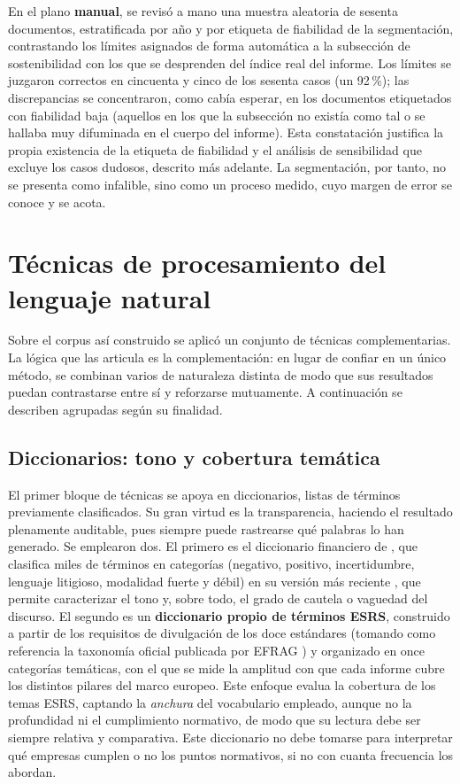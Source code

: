 En el plano \textbf{manual}, se revisó a mano una muestra aleatoria de sesenta documentos,
estratificada por año y por etiqueta de fiabilidad de la segmentación, contrastando los límites
asignados de forma automática a la subsección de sostenibilidad con los que se desprenden del
índice real del informe. Los límites se juzgaron correctos en cincuenta y cinco de los sesenta
casos (un 92\,\%); las discrepancias se concentraron, como cabía esperar, en los documentos
etiquetados con fiabilidad baja (aquellos en los que la subsección no existía como tal o se
hallaba muy difuminada en el cuerpo del informe). Esta constatación justifica la propia
existencia de la etiqueta de fiabilidad y el análisis de sensibilidad que excluye los casos
dudosos, descrito más adelante. La segmentación, por tanto, no se presenta como infalible, sino
como un proceso medido, cuyo margen de error se conoce y se acota.

\section{Técnicas de procesamiento del lenguaje natural}
\label{sec:tecnicas}

Sobre el corpus así construido se aplicó un conjunto de técnicas complementarias. La lógica que
las articula es la complementación: en lugar de confiar en un único método, se combinan varios de
naturaleza distinta de modo que sus resultados puedan contrastarse entre sí y reforzarse mutuamente. A continuación se describen
agrupadas según su finalidad.

\subsection{Diccionarios: tono y cobertura temática}

El primer bloque de técnicas se apoya en diccionarios, listas de términos
previamente clasificados. Su gran virtud es la transparencia, haciendo el resultado plenamente
auditable, pues siempre puede rastrearse qué palabras lo han generado. Se emplearon dos. El
primero es el diccionario financiero de \textcite{loughran2011}, que clasifica miles de
términos en categorías (negativo, positivo, incertidumbre, lenguaje litigioso, modalidad fuerte
y débil) en su versión más reciente \parencite{lmdict2024}, que permite caracterizar el tono y,
sobre todo, el grado de cautela o vaguedad del discurso. El segundo es un
\textbf{diccionario propio de términos ESRS}, construido a partir de los requisitos de
divulgación de los doce estándares (tomando como referencia la taxonomía oficial publicada por
EFRAG \parencite{efrag2023}) y organizado en once categorías temáticas, con el que se mide la
amplitud con que cada informe cubre los distintos pilares del marco europeo. Este enfoque evalua la cobertura de
los temas ESRS, captando la \textit{anchura} del vocabulario empleado, aunque no la profundidad ni el
cumplimiento normativo, de modo que su lectura debe ser siempre relativa y comparativa. Este diccionario no debe 
tomarse para interpretar qué empresas cumplen o no los puntos normativos, si no con cuanta frecuencia los abordan.

